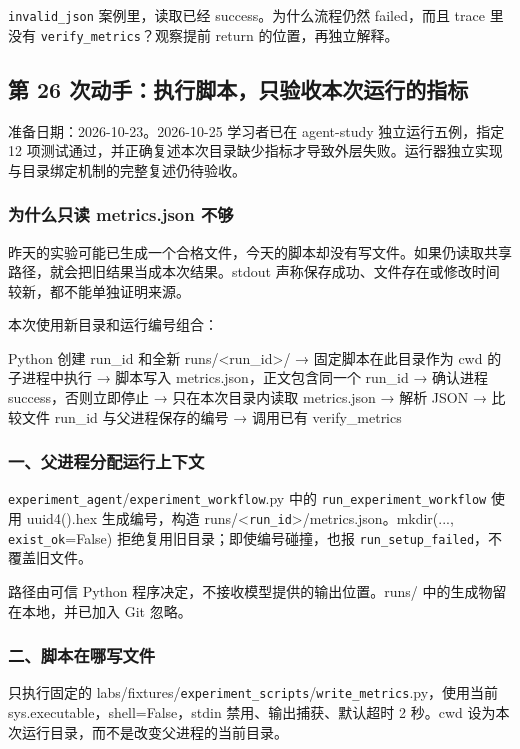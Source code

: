 \documentclass[UTF8,zihao=-4,fontset=fandol]{ctexart}
\begin{document}
\nolinkurl{invalid_json} 案例里，读取已经 success。为什么流程仍然 failed，而且 trace 里没有 \nolinkurl{verify_metrics}？观察提前 return 的位置，再独立解释。

\subsection{第 26 次动手：执行脚本，只验收本次运行的指标}

准备日期：2026-10-23。2026-10-25 学习者已在 agent-study 独立运行五例，指定 12 项测试通过，并正确复述本次目录缺少指标才导致外层失败。运行器独立实现与目录绑定机制的完整复述仍待验收。

\subsubsection{为什么只读 metrics.json 不够}

昨天的实验可能已生成一个合格文件，今天的脚本却没有写文件。如果仍读取共享路径，就会把旧结果当成本次结果。stdout 声称保存成功、文件存在或修改时间较新，都不能单独证明来源。

本次使用新目录和运行编号组合：

\begin{Code}
Python 创建 run_id 和全新 runs/<run_id>/
  → 固定脚本在此目录作为 cwd 的子进程中执行
  → 脚本写入 metrics.json，正文包含同一个 run_id
  → 确认进程 success，否则立即停止
  → 只在本次目录内读取 metrics.json
  → 解析 JSON
  → 比较文件 run_id 与父进程保存的编号
  → 调用已有 verify_metrics
\end{Code}

\subsubsection{一、父进程分配运行上下文}

\nolinkurl{experiment_agent}/\nolinkurl{experiment_workflow}.py 中的 \nolinkurl{run_experiment_workflow} 使用 uuid4().hex 生成编号，构造 runs/<\nolinkurl{run_id}>/metrics.json。mkdir(..., \nolinkurl{exist_ok}=False) 拒绝复用旧目录；即使编号碰撞，也报 \nolinkurl{run_setup_failed}，不覆盖旧文件。

路径由可信 Python 程序决定，不接收模型提供的输出位置。runs/ 中的生成物留在本地，并已加入 Git 忽略。

\subsubsection{二、脚本在哪写文件}

只执行固定的 labs/fixtures/\nolinkurl{experiment_scripts}/\nolinkurl{write_metrics}.py，使用当前 sys.executable，shell=False，stdin 禁用、输出捕获、默认超时 2 秒。cwd 设为本次运行目录，而不是改变父进程的当前目录。
\end{document}
